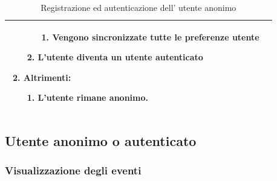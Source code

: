 \documentclass{article}
\begin{document}
\begin{table}[htbp]
\begin{tabularx}{\textwidth}{| l | p{} |}
\begin{enumerate}[topsep=5pt,partopsep=0pt,parsep=0pt,itemsep=0pt,before=\vspace{-\baselineskip},after=\vspace{-\baselineskip}]
\begin{enumerate}[leftmargin=*, nosep]
\begin{enumerate}[leftmargin=*, nosep]
                    \item Vengono sincronizzate tutte le preferenze utente
                \end{enumerate}
                \item L'utente diventa un utente autenticato
            \end{enumerate}
            \item Altrimenti:
            \begin{enumerate}[leftmargin=*, nosep]
                \item L'utente rimane anonimo.
            \end{enumerate}
        \end{enumerate}
        \\
        \hline
    \end{tabularx}
    \caption{Registrazione ed autenticazione dell' utente anonimo}
    \label{tab:tabella_use_case001}
\end{table}

\clearpage

\subsection{Utente anonimo o autenticato}

\subsubsection{Visualizzazione degli eventi}
\end{document}
